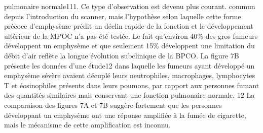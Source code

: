 \documentclass[12pt,]{article}
\begin{document}
pulmonaire normale111. Ce type d'observation est devenu plus courant.
commun depuis l'introduction du scanner, mais l'hypothèse selon laquelle
cette forme précoce d'emphysème prédit un déclin rapide de la fonction
et le développement ultérieur de la MPOC n'a pas été testée. Le fait
qu'environ 40\% des gros fumeurs développent un emphysème et que
seulement 15\% développent une limitation du débit d'air reflète la
longue évolution subclinique de la BPCO. La figure 7B présente les
données d'une étude12 dans laquelle les fumeurs ayant développé un
emphysème sévère avaient décuplé leurs neutrophiles, macrophages,
lymphocytes T et éosinophiles présents dans leurs poumons, par rapport
aux personnes fumant des quantités similaires mais conservant une
fonction pulmonaire normale. 12 La comparaison des figures 7A et 7B
suggère fortement que les personnes développant un emphysème ont une
réponse amplifiée à la fumée de cigarette, mais le mécanisme de cette
amplification est inconnu.
\end{document}
